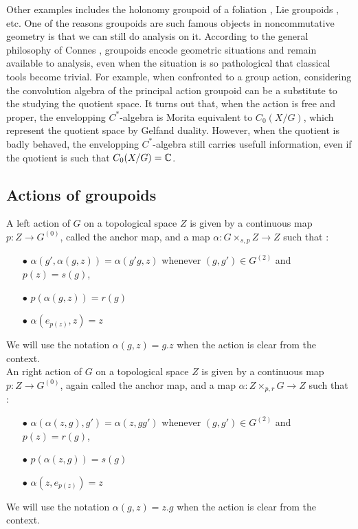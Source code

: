Other examples includes the holonomy groupoid of a foliation \cite{connesfoliations}, Lie groupoids \cite{paterson}, etc. One of the reasons groupoids are such famous objects in noncommutative geometry is that we can still do analysis on it. According to the general philosophy of Connes \cite{Connes94}, groupoids encode geometric situations and remain available to analysis, even when the situation is so pathological that classical tools become trivial. For example, when confronted to a group action, considering the convolution algebra of the principal action groupoid can be a substitute to the studying the quotient space. It turns out that, when the action is free and proper, the envelopping $C^*$-algebra is Morita equivalent to $C_0(X/G)$, which represent the quotient space by Gelfand duality. However, when the quotient is badly behaved, the envelopping $C^*$-algebra still carries usefull information, even if the quotient  is such that $C_0(X/G) = \mathbb C$.

\subsection{Actions of groupoids}

\begin{definition}
A left action of $G$ on a topological space $Z$ is given by a continuous map $p : Z \rightarrow G^{(0)}$, called the anchor map, and a map $\alpha : G\times_{s,p} Z \rightarrow Z $ such that :
\begin{itemize}
\item[$\bullet$] $\alpha(g',\alpha(g,z)) = \alpha(g'g,z)$ whenever $(g,g')\in G^{(2)}$ and $p(z)=s(g)$,
\item[$\bullet$] $p(\alpha(g,z))= r(g)$
\item[$\bullet$] $\alpha(e_{p(z)},z)=z$
\end{itemize} 
We will use the notation $\alpha(g,z) = g.z$ when the action is clear from the context.\\

An right action of $G$ on a topological space $Z$ is given by a continuous map $p : Z \rightarrow G^{(0)}$, again called the anchor map, and a map $\alpha : Z\times_{p,r} G \rightarrow Z $ such that :
\begin{itemize}
\item[$\bullet$] $\alpha(\alpha(z,g),g') = \alpha(z, gg')$ whenever $(g,g')\in G^{(2)}$ and $p(z)=r(g)$,
\item[$\bullet$] $p(\alpha(z,g))= s(g)$
\item[$\bullet$] $\alpha(z,e_{p(z)})=z$
\end{itemize} We will use the notation $\alpha(g,z) = z.g$ when the action is clear from the context.\\ 
\end{definition}

